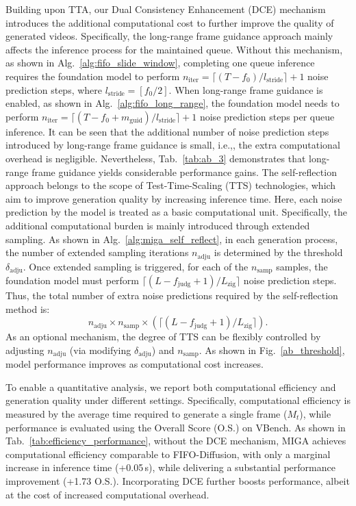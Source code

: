 \documentclass{llmxive}
\providecommand{\ie}{i.e.,\xspace}
\begin{document}
Building upon TTA, our Dual Consistency Enhancement (DCE) mechanism introduces the additional computational cost to further improve the quality of generated videos.
Specifically, the long-range frame guidance approach mainly affects the inference process for the maintained queue. Without this mechanism, as shown in Alg.~\ref{alg:fifo_slide_window}, completing one queue inference requires the foundation model to perform $n_\mathrm{iter} = \lceil (T - f_0) / l_\mathrm{stride} \rceil + 1$ noise prediction steps, where $l_\mathrm{stride} = [f_0 / 2]$.
When long-range frame guidance is enabled, as shown in Alg.~\ref{alg:fifo_long_range}, the foundation model needs to perform $n_\mathrm{iter} = \lceil (T - f_0 + m_\mathrm{guid}) / l_\mathrm{stride} \rceil + 1$ noise prediction steps per queue inference.  
It can be seen that the additional number of noise prediction steps introduced by long-range frame guidance is small, \ie, the extra computational overhead is negligible.
Nevertheless, Tab.~\ref{tab:ab_3} demonstrates that long-range frame guidance yields considerable performance gains.
The self-reflection approach belongs to the scope of Test-Time-Scaling (TTS) technologies, which aim to improve generation quality by increasing inference time. Here, each noise prediction by the model is treated as a basic computational unit.
Specifically, the additional computational burden is mainly introduced through extended sampling. 
As shown in Alg.~\ref{alg:miga_self_reflect}, in each generation process, the number of extended sampling iterations $n_{\mathrm{adju}}$ is determined by the threshold $\delta_{\mathrm{adju}}$. Once extended sampling is triggered, for each of the $n_{\mathrm{samp}}$ samples, the foundation model must perform $ \lceil (L - f_{\mathrm{judg}}+1) / L_{\mathrm{zig}} \rceil$ noise prediction steps.
Thus, the total number of extra noise predictions required by the self-reflection method is:
\begin{equation}
n_{\mathrm{adju}} \times n_{\mathrm{samp}} \times  \left( \lceil (L - f_{\mathrm{judg}}+1) / L_{\mathrm{zig}} \rceil \right ).
\end{equation}
As an optional mechanism, the degree of TTS can be flexibly controlled by adjusting $n_{\mathrm{adju}}$ (via modifying $\delta_{\mathrm{adju}}$) and $n_{\mathrm{samp}}$. As shown in Fig.~\ref{ab_threshold}, model performance improves as computational cost increases.

To enable a quantitative analysis, we report both computational efficiency and generation quality under different settings. Specifically, computational efficiency is measured by the average time required to generate a single frame ($M_t$), while performance is evaluated using the Overall Score (O.S.) on VBench. As shown in Tab.~\ref{tab:efficiency_performance}, without the DCE mechanism, MIGA achieves computational efficiency comparable to FIFO-Diffusion, with only a marginal increase in inference time (+0.05\,s), while delivering a substantial performance improvement (+1.73 O.S.). Incorporating DCE further boosts performance, albeit at the cost of increased computational overhead.
\end{document}
